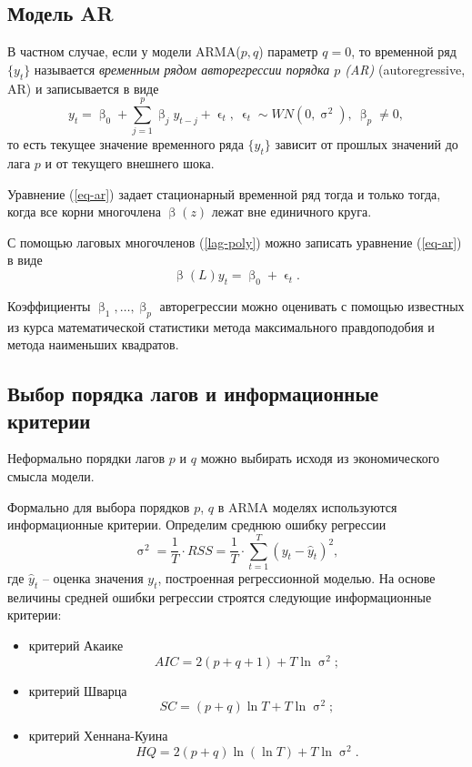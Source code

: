 \documentclass[a4paper, 14pt]{extreport}
\numberwithin{equation}{section}
\renewcommand{\beta}{\upbeta}
\renewcommand{\epsilon}{\upvarepsilon}
\renewcommand{\sigma}{\upsigma}
\numberwithin{equation}{section}
\begin{document}
 	\subsection{Модель AR}
 	\label{subsec:autoregressive}
 	
 	В частном случае, если у модели ARMA($p,q$) параметр $q=0$, то временной ряд $\{y_t\}$ называется \textit{временным рядом авторегрессии порядка $p$ (AR)} (autoregressive, AR) и записывается в виде
 	\begin{equation}\label{eq-ar}
 		y_t = \beta_0 + \sum_{j=1}^{p}\beta_j y_{t-j} + \epsilon_t,\ \epsilon_t\sim WN(0,\sigma^2),\ \beta_p \ne 0, 
 	\end{equation}
 	то есть текущее значение временного ряда $\{y_t\}$ зависит от прошлых значений до лага $p$ и от текущего внешнего шока.
 	
 	Уравнение (\ref{eq-ar}) задает стационарный временной ряд тогда и только тогда, когда все корни многочлена 
 	$\beta(z)$ лежат вне единичного круга.
 	
 	С помощью лаговых многочленов (\ref{lag-poly}) можно записать уравнение (\ref{eq-ar}) в виде
 	\begin{equation}
 		\beta(L)y_t = \beta_0 + \epsilon_t.
 	\end{equation}
 	
	Коэффициенты $\beta_1,\ldots, \beta_p$ авторегрессии можно оценивать с помощью известных из курса математической статистики метода максимального правдоподобия и метода наименьших квадратов.
	
	\subsection{Выбор порядка лагов и информационные критерии}
	\label{subsec:lags-and-inf-crit}
	
	Неформально порядки лагов $p$ и $q$ можно выбирать исходя из экономического смысла модели.
	
	Формально для выбора порядков $p$, $q$ в ARMA моделях используются информационные критерии. Определим среднюю ошибку регрессии
	\begin{equation}
		\sigma^2 = \dfrac{1}{T}\cdot RSS = \dfrac{1}{T}\cdot \sum_{t=1}^{T}(y_t - \hat y_t)^2,
	\end{equation} 
	где $\hat y_t$ -- оценка значения $y_t$, построенная регрессионной моделью. На основе величины средней ошибки регрессии строятся следующие информационные критерии:
	\begin{itemize}
		\item критерий Акаике \cite{5}
		\begin{equation}
			AIC = 2(p+q+1) + T\ln \sigma^2;
		\end{equation}
		\item критерий Шварца \cite{6}
		\begin{equation}
			SC = (p+q)\ln T + T\ln \sigma^2;
		\end{equation}
		\item критерий Хеннана-Куина \cite{7}
		\begin{equation}
			HQ = 2(p+q)\ln(\ln T) + T\ln \sigma^2.
		\end{equation}
	\end{itemize}
	
\end{document}

